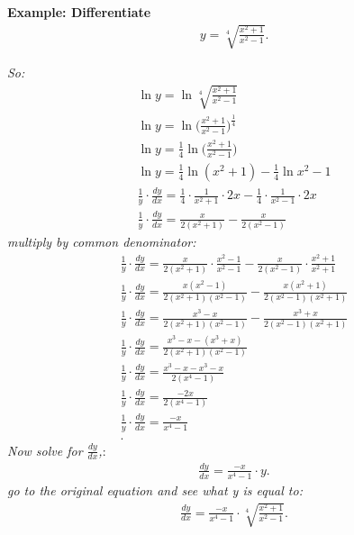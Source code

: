 \documentclass{report}
\begin{document}
  \bigbreak \noindent 
  \begin{mdframed}
    \textbf{Example: Differentiate}
    \begin{align*}
      y = \sqrt[4]{\frac{x^{2}+1}{x^{2}-1}}
    .\end{align*}
  \end{mdframed}
  \bigbreak \noindent
  \textit{So:}
  \begin{align*}
    \ln{y} = \ln{\sqrt[4]{\frac{x^{2}+1}{x^{2}-1}}} \\ 
    \ln{y} = \ln{\bigg(\frac{x^{2}+1}{x^{2}-1}}\bigg)^{\frac{1}{4}} \\ 
    \ln{y} = \frac{1}{4}\ln{\bigg(\frac{x^{2}+1}{x^{2}-1}}\bigg) \\ 
    \ln{y} = \frac{1}{4} \ln{(x^{2}+1) - \frac{1}{4} \ln{x^{2}-1}} \\ 
    \frac{1}{y} \cdot  \frac{dy}{dx} =  \frac{1}{4} \cdot \frac{1}{x^{2}+1} \cdot 2x -\frac{1}{4}\cdot \frac{1}{x^{2}-1}\cdot 2x \\
    \frac{1}{y}\cdot \frac{dy}{dx} = \frac{x}{2(x^{2}+1)} - \frac{x}{2(x^{2} -1)}
  \end{align*}
  \textit{multiply by common denominator:}
  \begin{align*}
    \frac{1}{y}\cdot \frac{dy}{dx} = \frac{x}{2(x^{2}+1)} \cdot \frac{x^{2}-1}{x^{2} -1} - \frac{x}{2(x^{2} -1)} \cdot \frac{x^{2}+1}{x^{2}+1}\\
    \frac{1}{y}\cdot \frac{dy}{dx} = \frac{x(x^{2}-1)}{2(x^{2}+1)(x^{2}-1)}  - \frac{x(x^{2}+1)}{2(x^{2} -1)(x^{2}+1)} \\
    \frac{1}{y}\cdot \frac{dy}{dx} = \frac{x^{3}-x}{2(x^{2}+1)(x^{2}-1)}  - \frac{x^{3}+x}{2(x^{2} -1)(x^{2}+1)} \\
    \frac{1}{y}\cdot \frac{dy}{dx} = \frac{x^{3}-x-(x^{3}+x)}{2(x^{2}+1)(x^{2}-1)}   \\
    \frac{1}{y}\cdot \frac{dy}{dx} = \frac{x^{3}-x-x^{3}-x}{2(x^{4}-1)}   \\
    \frac{1}{y}\cdot \frac{dy}{dx} = \frac{-2x}{2(x^{4}-1)}   \\
    \frac{1}{y}\cdot \frac{dy}{dx} = \frac{-x}{x^{4}-1}   \\
  .\end{align*}
  \textit{Now solve for $\frac{dy}{dx}$,}:
  \begin{align*}
    \frac{dy}{dx} = \frac{-x}{x^{4}-1} \cdot y
  .\end{align*}
  \textit{go to the original equation and see what y is equal to:}
  \begin{align*}
    \frac{dy}{dx} = \frac{-x}{x^{4}-1} \cdot \sqrt[4]{\frac{x^{2}+1}{x^{2}-1}}
  .\end{align*}
\end{document}
